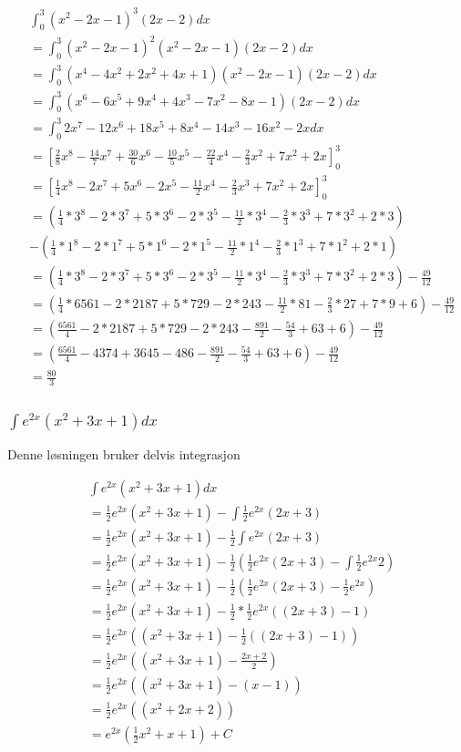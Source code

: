 \documentclass{article}
\begin{document}
\begin{align*}
    & \int_{0}^{3} (x^2-2x-1)^3(2x-2) dx \\
    &= \int_{0}^{3} (x^2-2x-1)^2(x^2-2x-1)(2x-2) dx \\
    &= \int_{0}^{3} (x^4-4x^2+2x^2+4x+1)(x^2-2x-1)(2x-2) dx \\
    &= \int_{0}^{3} (x^6-6x^5+9x^4+4x^3-7x^2-8x-1)(2x-2) dx \\
    &= \int_{0}^{3} 2x^7-12x^6+18x^5+8x^4-14x^3-16x^2-2x dx \\
    &= [\frac{2}{8}x^8-\frac{14}{7}x^7+\frac{30}{6}x^6-\frac{10}{5}x^5-\frac{22}{4}x^4-\frac{2}{3}x^2+7x^2+2x]^3_0 \\
    &= [\frac{1}{4}x^8-2x^7+5x^6-2x^5-\frac{11}{2}x^4-\frac{2}{3}x^3+7x^2+2x]^3_0 \\
    &= (\frac{1}{4}*3^8-2*3^7+5*3^6-2*3^5-\frac{11}{2}*3^4-\frac{2}{3}*3^3+7*3^2+2*3) \\
    &- (\frac{1}{4}*1^8-2*1^7+5*1^6-2*1^5-\frac{11}{2}*1^4-\frac{2}{3}*1^3+7*1^2+2*1) \\
    &= (\frac{1}{4}*3^8-2*3^7+5*3^6-2*3^5-\frac{11}{2}*3^4-\frac{2}{3}*3^3+7*3^2+2*3) - \frac{49}{12} \\
    &= (\frac{1}{4}*6561- 2*2187+5*729-2*243-\frac{11}{2}*81-\frac{2}{3}*27+7*9+6) - \frac{49}{12} \\
    &= (\frac{6561}{4}- 2*2187+5*729-2*243-\frac{891}{2}-\frac{54}{3}+63+6) - \frac{49}{12} \\
    &= (\frac{6561}{4}- 4374+3645-486-\frac{891}{2}-\frac{54}{3}+63+6) - \frac{49}{12} \\
    &= \frac{80}{3}
\end{align*}

\subsubsection{$\int e^{2x}(x^2+3x+1) dx$}

Denne løsningen bruker delvis integrasjon

\begin{align*}
    & \int e^{2x}(x^2+3x+1) dx \\ 
    &= \frac{1}{2} e^{2x} (x^2+3x+1) - \int \frac{1}{2} e^{2x} (2x+3) \\
    &= \frac{1}{2} e^{2x} (x^2+3x+1) - \frac{1}{2} \int e^{2x} (2x+3) \\
    &= \frac{1}{2} e^{2x} (x^2+3x+1) - \frac{1}{2} ( \frac{1}{2} e^{2x} (2x+3) - \int \frac{1}{2} e^{2x}2) \\
    &= \frac{1}{2} e^{2x} (x^2+3x+1) - \frac{1}{2} ( \frac{1}{2} e^{2x} (2x+3) - \frac{1}{2} e^{2x}) \\
    &= \frac{1}{2} e^{2x} (x^2+3x+1) - \frac{1}{2} * \frac{1}{2} e^{2x} ((2x+3) - 1) \\
    &= \frac{1}{2} e^{2x} ((x^2+3x+1) - \frac{1}{2} ((2x+3) - 1)) \\
    &= \frac{1}{2} e^{2x} ((x^2+3x+1) - \frac{2x+2}{2}) \\
    &= \frac{1}{2} e^{2x} ((x^2+3x+1) - (x-1)) \\
    &= \frac{1}{2} e^{2x} ((x^2+2x+2)) \\ 
    &= e^{2x} (\frac{1}{2} x^2 + x + 1) + C
\end{align*}
\end{document}
